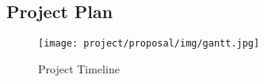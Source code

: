 \begin{landscape}
\thispagestyle{empty}
\section{Project Plan} \label{sec:plan}


\begin{figure}[H]
    \centering
    \texttt{[image: project/proposal/img/gantt.jpg]}
    \caption{Project Timeline}
    \label{fig:gantt}
\end{figure}
\end{landscape}
